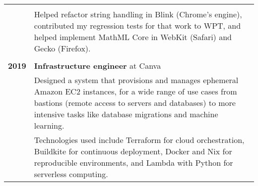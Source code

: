 \documentclass[a4paper,12pt]{article}
\begin{document}
\begin{tabular}{p{35mm}p{125mm}}
	\vspace{0.2em}  \\                              & Helped refactor string handling in Blink (Chrome’s engine), contributed my regression tests for that work to WPT, and helped implement MathML Core in WebKit (Safari) and Gecko (Firefox).
	\\              \\  \textbf{2019}               & \textbf{Infrastructure engineer} at Canva
	\vspace{0.2em}  \\                              & Designed a system that provisions and manages ephemeral Amazon EC2 instances, for a wide range of use cases from bastions (remote access to servers and databases) to more intensive tasks like database migrations and machine learning.
	\vspace{0.2em}  \\                              & Technologies used include Terraform for cloud orchestration, Buildkite for continuous deployment, Docker and Nix for reproducible environments, and Lambda with Python for serverless computing.
\end{tabular}
\end{document}
